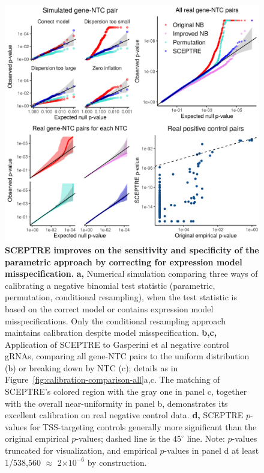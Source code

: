 \documentclass{nature}
\begin{document}
\clearpage
\thispagestyle{empty} 
\addtocounter{page}{-1}
\begin{figure}[h!]
	\includegraphics[width = \textwidth]{figures/Figure3/Figure3.png}
	\caption{\textbf{SCEPTRE improves on the sensitivity and specificity of the parametric approach by correcting for expression model misspecification.} \textbf{a,} Numerical simulation comparing three ways of calibrating a negative binomial test statistic (parametric, permutation, conditional resampling), when the test statistic is based on the correct model or contains expression model misspecifications. Only the conditional resampling approach maintains calibration despite model misspecification. \textbf{b,c,} Application of SCEPTRE to Gasperini et al negative control gRNAs, comparing all gene-NTC pairs to the uniform distribution (b) or breaking down by NTC (c); details as in Figure~\ref{fig:calibration-comparison-all}a,c. The matching of SCEPTRE's colored region with the gray one in panel c, together with the overall near-uniformity in panel b, demonstrates its excellent calibration on real negative control data. \textbf{d,} SCEPTRE $p$-values for TSS-targeting controls generally more significant than the original empirical $p$-values; dashed line is the $45^\circ$ line. Note: $p$-values truncated for visualization, and empirical $p$-values in panel d at least 1/538,560 $\approx$ 2$\times 10^{-6}$ by construction.}
	\label{fig:calibration}
\end{figure}
\clearpage
\end{document}
